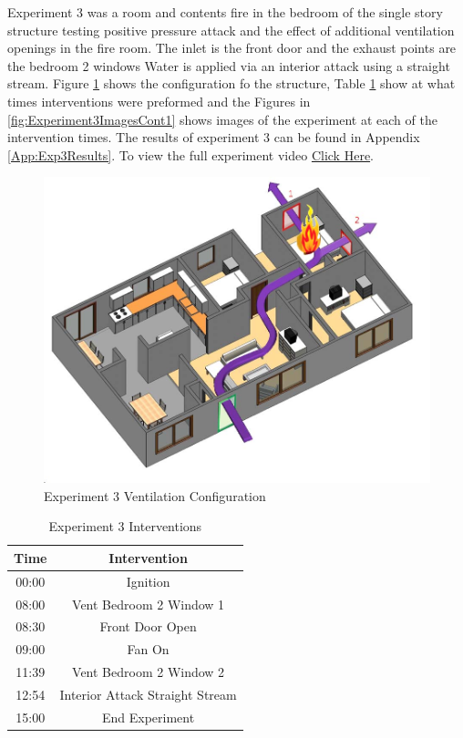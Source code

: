 \documentclass{article}
\begin{document}
Experiment 3 was a room and contents fire in the bedroom of the single story structure testing positive pressure attack and the effect of additional ventilation openings in the fire room. The inlet is the front door and the exhaust points are the bedroom 2 windows Water is applied via an interior attack using a straight stream. Figure \ref{fig:Exp3VentConfig} shows the configuration fo the structure, Table \ref{Table:Exp3Interventions} show at what times interventions were preformed and the Figures in \ref{fig:Experiment3ImagesCont1} shows images of the experiment at each of the intervention times. The results of experiment 3 can be found in Appendix \ref{App:Exp3Results}. To view the full experiment video \href{https://youtu.be/fi9lZvUhMwE}{Click Here}.

\begin{figure}[H]
	\centering
	\includegraphics[width=5in]{0_Images/FireExperiments/Single_Story/Experiment_3.jpg}
	\caption{Experiment 3 Ventilation Configuration}
	\label{fig:Exp3VentConfig}
\end{figure}

\begin{table}[H]
	\centering
	\caption{Experiment 3 Interventions}
	\begin{tabular}{|c|c|} 
		\hline
		Time & Intervention \\ \hline \hline
		00:00 & Ignition \\ \hline
		08:00 & Vent Bedroom 2 Window 1 \\ \hline
		08:30 & Front Door Open \\ \hline
		09:00 & Fan On \\ \hline
		11:39 & Vent Bedroom 2 Window 2 \\ \hline
		12:54 & Interior Attack Straight Stream \\ \hline
		15:00 & End Experiment \\ \hline
	\end{tabular}
	\label{Table:Exp3Interventions}
\end{table}
\end{document}
